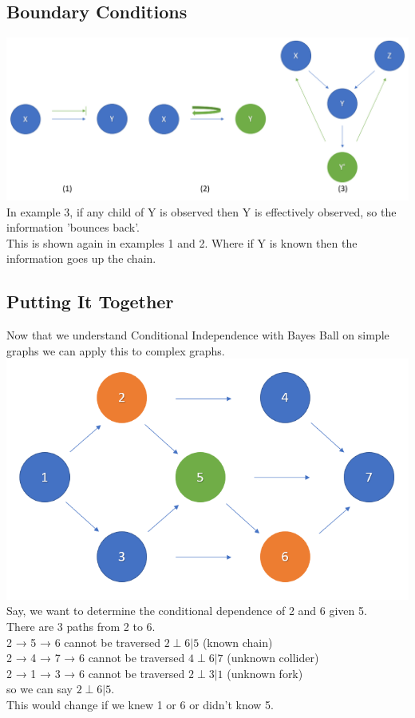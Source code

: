 \documentclass{article}
\begin{document}
\subsection{Boundary Conditions}
\includegraphics[scale=0.4]{Screenshot_11.png}\\
In example 3, if any child of Y is observed then Y is effectively observed, so the information 'bounces back'.\\
This is shown again in examples 1 and 2. Where if Y is known then the information goes up the chain.\\
\pagebreak
\subsection{Putting It Together}
Now that we understand Conditional Independence with Bayes Ball on simple graphs we can apply this to complex graphs.\\
\includegraphics[scale=0.7]{Screenshot_10.png}\\
Say, we want to determine the conditional dependence of 2 and 6 given 5.\\
There are 3 paths from 2 to 6. \\
2 → 5 → 6 cannot be traversed $2\perp 6 | 5$ (known chain)\\
2 → 4 → 7 → 6 cannot be traversed $4 \perp 6 | 7$ (unknown collider)\\
2 → 1 → 3 → 6 cannot be traversed $2 \perp 3 | 1$ (unknown fork)\\
so we can say $2 \perp 6 | 5$.\\
This would change if we knew 1 or 6 or didn't know 5.
\end{document}
